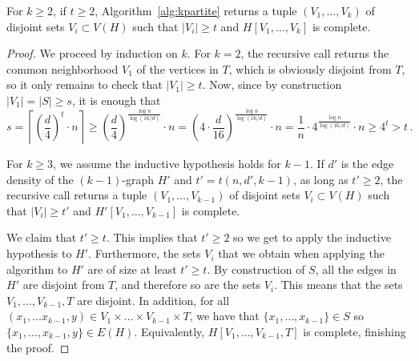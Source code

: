 \begin{theorem}
    For $k \geq 2$, if $t \geq 2$, Algorithm~\ref{alg:kpartite} returns a tuple $(V_1, \dots, V_k)$ of disjoint sets $V_i \subset V(H)$ such that
    $|V_i| \geq t$ and $H[V_1, \dots, V_k]$ is complete.

    \begin{proof}
        We proceed by induction on $k$.
        For $k=2$, the recursive call returns the common neighborhood $V_1$ of the vertices in $T$,
        which is obviously disjoint from $T$, so it only remains to check that $|V_1| \geq t$.
        Now, since by construction $|V_1| = |S| \geq s$, it is enough that
        \[
            s
            = \left\lceil \left( \frac{d}{4} \right)^t \cdot n \right\rceil
            \geq \left( \frac{d}{4} \right)^{\frac{\log n}{\log(16/d)}}  \cdot n
            = \left( 4 \cdot \frac{d}{16} \right)^{\frac{\log n}{\log(16/d)}} \cdot n
            = \frac{1}{n} \cdot 4^{\frac{\log n}{\log(16/d)}} \cdot n
            \geq 4^t
            > t\,.
        \]

        For $k \geq 3$, we assume the inductive hypothesis holds for $k-1$.
        If $d'$ is the edge density of the $(k-1)$-graph $H'$
        and $t' = t(n, d', k-1)$, as long as $t' \geq 2$, the recursive call returns
        a tuple $(V_1, \dots, V_{k-1})$ of disjoint sets $V_i \subset V(H)$ such that
        $|V_i| \geq t'$ and $H'[V_1, \dots, V_{k-1}]$ is complete.

        We claim that $t' \geq t$.
        This implies that $t' \geq 2$ so we get to apply the inductive hypothesis to $H'$.
        Furthermore, the sets $V_i$ that we obtain when applying the algorithm to $H'$
        are of size at least $t' \geq t$.
        By construction of $S$, all the edges in $H'$ are disjoint from $T$,
        and therefore so are the sets $V_i$.
        This means that the sets $V_1, \dots, V_{k-1}, T$ are disjoint.
        In addition, for all $(x_1, \dots x_{k-1}, y) \in V_1 \times \dots \times V_{k-1} \times T$,
        we have that $\{x_1, \dots, x_{k-1}\} \in S$ so $\{x_1, \dots, x_{k-1}, y\} \in E(H)$.
        Equivalently, $H[V_1, \dots, V_{k-1}, T]$ is complete, finishing the proof.


\end{proof}
\end{theorem}
